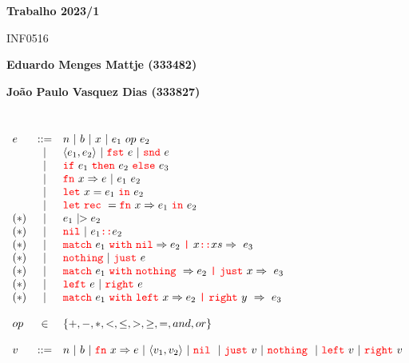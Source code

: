 \documentclass[a4paper,12pt]{report}
\newcommand{\sintaxe}[1]{{\texttt{\textcolor{red}{#1}}}}
\newcommand{\IF}{\sintaxe{if}}
\newcommand{\THEN}{\sintaxe{then}}
\newcommand{\ELSE}{\sintaxe{else}}
\newcommand{\FN}{\sintaxe{fn}}
\newcommand{\LET}{\sintaxe{let}}
\newcommand{\REC}{\sintaxe{rec}}
\newcommand{\IN}{\sintaxe{in}}
\newcommand{\NIL}{\sintaxe{nil}}
\newcommand{\MATCH}{\sintaxe{match}}
\newcommand{\WITH}{\sintaxe{with}}
\newcommand{\FST}{\sintaxe{fst}}
\newcommand{\SND}{\sintaxe{snd}}
\newcommand{\LEFT}{\sintaxe{left}}
\newcommand{\RIGHT}{\sintaxe{right}}
\newcommand{\NOTHING}{\sintaxe{nothing}}
\newcommand{\JUST}{\sintaxe{just}}
\begin{document}
\begin{center}
    \Large
    \textbf{Trabalho 2023/1}
        
    \vspace{0.4cm}
    \large
    INF0516
        
    \vspace{0.4cm}
    \textbf{Eduardo Menges Mattje (333482)}
    
    \vspace{0.2cm}
    \textbf{João Paulo Vasquez Dias (333827)}
       
    \vspace{0.9cm}
\end{center}

\\ 


\[ 
\begin{array}{lcl}
e &  ::=   &  n ~ | ~   b ~ | ~ x ~ |~   e_1 \ op \ e_2\\
  & |   &  \langle e_1, e_2 \rangle ~ | ~  \FST  \  e  ~ | ~  \SND \ e \\
   & |   &   \IF \ e_1 \ \THEN  \ e_2 \ \ELSE \  e_3\\
   &~| ~ &  \FN \ x \Rightarrow  e ~ | ~  e_1 \ e_2 \\
  & ~| ~&  \LET \ x  =  e_1 \ \IN \  e_2 \\
  &~ | ~  & \LET \ \REC \ = \FN \ x \Rightarrow  e_1 \ \IN \ e_2   \\
(*) &~ | ~ &  e_1 \ {\small{|}}\!\!> e_2\\
(*)  &~ | ~  &  \NIL ~ | ~  e_1 \sintaxe{::} e_2  \\
(*)   & ~| ~  & \MATCH \ e_1 \ \WITH \ \NIL \Rightarrow e_2 \ \sintaxe{|}\  x\sintaxe{::} xs \Rightarrow \ e_3  \\
(*)     &~ | ~  & \NOTHING  ~| ~ \JUST\ e   \\ 
(*)    & ~| ~  & \MATCH \ e_1 \ \WITH \ \NOTHING\ \Rightarrow e_2 \ \sintaxe{|}\  \JUST\ x  \Rightarrow \ e_3\\
(*)       &~ | ~  & \LEFT\ e  ~| ~ \RIGHT\ e \\ 
 (*)   & ~| ~  & \MATCH \ e_1 \ \WITH \ \LEFT\ x  \Rightarrow e_2 \ \sintaxe{|}\  \RIGHT\  y \   \Rightarrow \ e_3\\
   & & \\
 op & \in & \{ +, -, \ast, <, \leq, >, \geq, =, and, or\} \\
 & & \\
 v & ::= & n  ~ | ~ b ~ | ~ \FN \ x \Rightarrow e  ~ | ~ \langle v_1, v_2 \rangle
 ~ | ~  \NIL\ ~ | ~ \JUST\ v ~ | ~  \NOTHING\ ~ | ~  \LEFT\ v ~ | ~  \RIGHT\ v\\
 \end{array}
 \]
\end{document}
